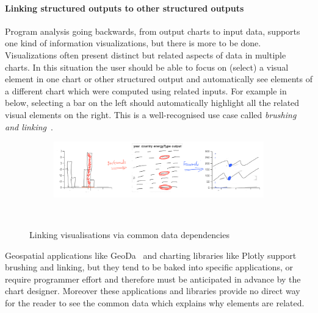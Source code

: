 \paragraph{Linking structured outputs to other structured outputs}
Program analysis going backwards, from output charts to input data, supports one kind of information visualizations, but there is more to be done. Visualizations often present distinct but related aspects of data in multiple charts. In this situation the user should be able to focus on (select) a visual element in one chart or other structured output and automatically see elements of a different chart which were computed using related inputs. For example in  below, selecting a bar on the left should automatically highlight all the related visual elements on the right. This is a well-recognised use case called \emph{brushing and linking}~\cite{becker87}.

\begin{figure}[H]
  \begin{subfigure}[b]{0.99\textwidth}
     \centering
     {\includegraphics[scale=0.36]{fig/example/vis-linking-revised.png}}
  \end{subfigure}\\
  \begin{subfigure}{0.65\textwidth}
     \small
     
  \end{subfigure}
 \caption{Linking visualisations via common data dependencies}
 \label{fig:introduction:vis-linking}
\end{figure}

Geospatial applications like GeoDa~\cite{anselin06} and charting libraries like Plotly support brushing and linking, but they tend to be baked into specific applications, or require programmer effort and therefore must be anticipated in advance by the chart designer. Moreover these applications and libraries provide no direct way for the reader to see the common data which explains why elements are related.

